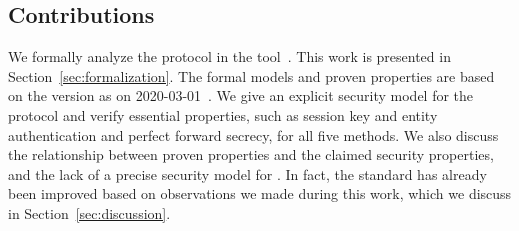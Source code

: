 \documentclass[runningheads, envcountsame, a4paper, draft, x11names]{llncs}
\begin{document}
 
\subsection{Contributions}
\label{sec:contributions}
 
We formally analyze the \mEdhoc{} protocol in the \mTamarin{} tool~\cite{DBLP:conf/cav/MeierSCB13}. This work is presented in Section~\ref{sec:formalization}. The formal models and proven properties are based on the version as on 2020-03-01~\cite{selander-lake-edhoc-01}. We give an explicit security model for the protocol and verify essential properties, such as session key and entity authentication and perfect forward secrecy, for all five methods.
We also discuss the relationship between proven properties and the claimed security properties, and the lack of a precise security model for \mEdhoc{}. In fact, the standard has already been improved based on observations we made during this work, which we discuss in Section~\ref{sec:discussion}.

\end{document}
